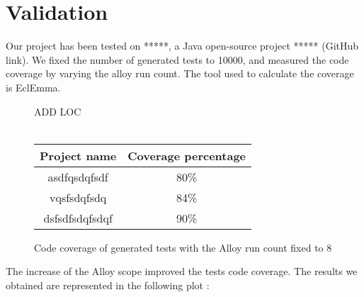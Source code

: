 \section{Validation}
\label{sec:Validation}
	Our project has been tested on *****, a Java open-source project ***** (GitHub link). We fixed the number of generated tests to 10000, and measured the code coverage by varying the alloy run count. The tool used to calculate the coverage is EclEmma.\cite{eclemma}\\
	
\begin{figure}[!h]
\begin{center}
ADD LOC \\~\\
\begin{tabular}{|c|c|}

 \hline
 \textbf{Project name} & \textbf{Coverage percentage}\\
 \hline
 asdfqsdqfsdf   & 80\%\\ 
 \hline
 vqsfsdqfsdq & 84\%\\
 \hline
 dsfsdfsdqfsdqf & 90\%\\

 \hline
\end{tabular}
\caption{Code coverage of generated tests with the Alloy run count fixed to 8}
\end{center}
\end{figure}

The increase of the Alloy scope improved the tests code coverage. The results we obtained are represented in the following plot :\\

\pgfplotsset{width=\textwidth,compat=1.9}

{\setlength{\parindent}{0cm}
}